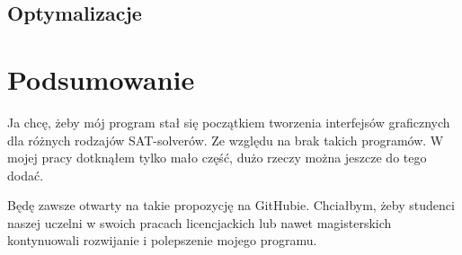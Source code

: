 \documentclass[a4paper,12pt,oneside]{book}
\theoremstyle{definition}
\begin{document}
\lipsum[3]

\section{Optymalizacje}

\lipsum[1]

\lipsum[2]

\lipsum[3]

\lipsum[4]

\chapter*{Podsumowanie}

Ja chcę, żeby mój program stał się początkiem tworzenia interfejsów graficznych dla różnych rodzajów SAT-solverów. Ze względu na brak takich programów. W mojej pracy dotknąłem tylko mało część, dużo rzeczy można jeszcze do tego dodać.

Będę zawsze otwarty na takie propozycję na GitHubie. Chciałbym, żeby studenci naszej uczelni w swoich pracach licencjackich lub nawet magisterskich kontynuowali rozwijanie i polepszenie mojego programu.

\end{document}
